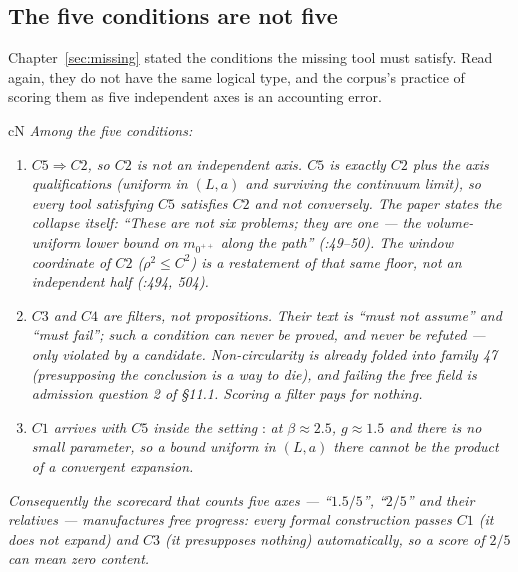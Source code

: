 \subsection{The five conditions are not five}
\label{sec:scalar-five}

Chapter~\ref{sec:missing} stated the conditions the missing tool must satisfy. Read again, they do
not have the same logical type, and the corpus's practice of scoring them as five independent axes
is an accounting error.

\begin{claimbox}{cN}
 \emph{Among the five conditions:}
\begin{enumerate}
\item \emph{$C5\Rightarrow C2$, so $C2$ is not an independent axis. $C5$ is exactly $C2$ plus the
  axis qualifications (uniform in $(L,a)$ and surviving the continuum limit), so every tool
  satisfying $C5$ satisfies $C2$ and not conversely. The paper states the collapse itself:
  ``These are not six problems; they are one --- the volume-uniform lower bound on
  $m_{0^{++}}$ along the path'' (:49--50). The window coordinate of $C2$
  ($\rho^2\le C^2$) is a restatement of that same floor, not an independent half
  (:494, 504).}
\item \emph{$C3$ and $C4$ are filters, not propositions.} \emph{Their text is ``must not assume''
  and ``must fail''; such a condition can never be proved, and never be refuted --- only violated
  by a candidate. Non-circularity is already folded into family 47 (presupposing the conclusion is
  a way to die), and failing the free field is admission question 2 of \S11.1. Scoring a filter
  pays for nothing.}
\item \emph{$C1$ arrives with $C5$ inside the setting} \LC: \emph{at $\beta\approx2.5$, $g\approx1.5$
  and there is no small parameter, so a bound uniform in $(L,a)$ there cannot be the product of a
  convergent expansion.}
\end{enumerate}
\emph{Consequently the scorecard that counts five axes --- ``$1.5/5$'', ``$2/5$'' and their
relatives --- manufactures free progress: every formal construction passes $C1$ (it does not
expand) and $C3$ (it presupposes nothing) automatically, so a score of $2/5$ can mean zero
content.}
\LN{}
\end{claimbox}


